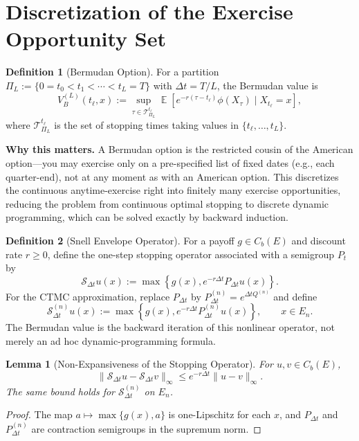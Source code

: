 \documentclass[11pt,a4paper,openany]{book}
\theoremstyle{definition}
\newtheorem{definition}{Definition}[chapter]
\theoremstyle{plain}
\newtheorem{lemma}[theorem]{Lemma}
\theoremstyle{remark}
\DeclareMathOperator{\E}{\mathbb{E}}
\newcommand{\1}{\mathbbm{1}}
\newcommand{\calT}{\mathcal{T}}
\begin{document}
\section{Discretization of the Exercise Opportunity Set}

\begin{definition}[Bermudan Option]
For a partition $\Pi_{L} := \{0 = t_{0} < t_{1} < \cdots < t_{L} = T\}$ with $\Delta t = T/L$, the Bermudan value is
\[
V_{B}^{(L)}(t_{\ell}, x) := \sup_{\tau \in \calT_{\Pi_{L}}^{t_{\ell}}} \E\left[e^{-r(\tau - t_{\ell})} \phi(X_{\tau}) \mid X_{t_{\ell}} = x\right],
\]
where $\calT_{\Pi_{L}}^{t_{\ell}}$ is the set of stopping times taking values in $\{t_{\ell}, \ldots, t_{L}\}$.
\end{definition}

\medskip

\noindent\textbf{Why this matters.} A Bermudan option is the restricted cousin of the American option---you may exercise only on a pre-specified list of fixed dates (e.g., each quarter-end), not at any moment as with an American option. This discretizes the continuous anytime-exercise right into finitely many exercise opportunities, reducing the problem from continuous optimal stopping to discrete dynamic programming, which can be solved exactly by backward induction.

\begin{definition}[Snell Envelope Operator]
For a payoff $g\in C_b(E)$ and discount rate $r\ge0$, define the one-step stopping operator associated with a semigroup $P_t$ by
\[
\mathcal{S}_{\Delta t}u(x) := \max\left\{g(x), e^{-r\Delta t}P_{\Delta t}u(x)\right\}.
\]
For the CTMC approximation, replace $P_{\Delta t}$ by $P_{\Delta t}^{(n)}=e^{\Delta t Q^{(n)}}$ and define
\[
\mathcal{S}_{\Delta t}^{(n)}u(x) := \max\left\{g(x), e^{-r\Delta t}P_{\Delta t}^{(n)}u(x)\right\}, \qquad x\in E_n.
\]
The Bermudan value is the backward iteration of this nonlinear operator, not merely an ad hoc dynamic-programming formula.
\end{definition}

\begin{lemma}[Non-Expansiveness of the Stopping Operator]
For $u,v\in C_b(E)$,
\[
\|\mathcal{S}_{\Delta t}u-\mathcal{S}_{\Delta t}v\|_\infty
\le e^{-r\Delta t}\|u-v\|_\infty.
\]
The same bound holds for $\mathcal{S}_{\Delta t}^{(n)}$ on $E_n$.
\end{lemma}

\begin{proof}
The map $a\mapsto \max\{g(x),a\}$ is one-Lipschitz for each $x$, and $P_{\Delta t}$ and $P_{\Delta t}^{(n)}$ are contraction semigroups in the supremum norm.
\end{proof}
\end{document}
